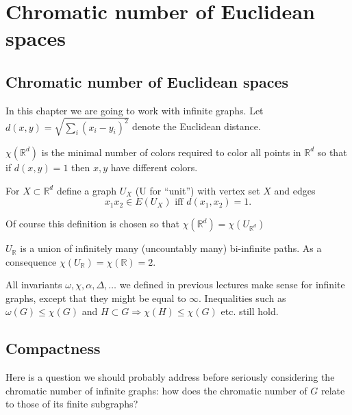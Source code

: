\chapter{Chromatic number of Euclidean spaces}

\section{Chromatic number of Euclidean spaces}
In this chapter we are going to work with infinite graphs. Let $d(x,y) = \sqrt{\sum_i (x_i - y_i)^2}$ denote the Euclidean distance.

\begin{definition}
$\chi(\mathbb{R}^d)$ is the minimal number of colors required to color
all points in $\mathbb{R}^d$ so that if $d(x,y) = 1$ then $x,y$ have
different colors.
\end{definition}
\begin{definition}
For $X \subset \mathbb{R}^d$ define a graph $U_X$ (U for ``unit'') with
vertex set $X$ and edges
\[
x_1x_2 \in E(U_X) \text{ iff } d(x_1,x_2) = 1.
\]
\end{definition}
Of course this definition is chosen so that 
$\chi(\mathbb{R}^d) = \chi(U_{\mathbb{R}^d})$

\begin{example}
$U_{\mathbb{R}}$ is a union of infinitely many (uncountably many)
bi-infinite paths. As a consequence $\chi(U_{\mathbb{R}}) = \chi(\mathbb{R}) = 2$.
\end{example}
\begin{remark}
All invariants $\omega, \chi, \alpha, \Delta, \ldots$ we defined in previous lectures make sense for infinite graphs, except that they might be equal to
$\infty$. Inequalities such as $\omega(G) \le \chi(G)$ and $H \subset G \Rightarrow \chi(H)\le \chi(G)$ etc. still hold.
\end{remark}

\section{Compactness}

Here is a question we should probably address before seriously considering the chromatic number of infinite graphs: how does the chromatic number of $G$ relate to those of its finite subgraphs?

